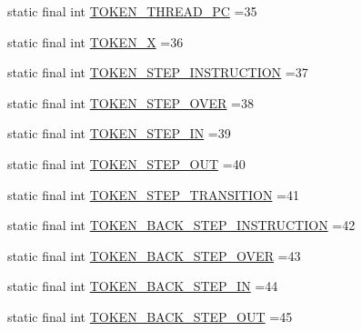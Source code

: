 \begin{DoxyCompactItemize}
static final int \hyperlink{classgov_1_1nasa_1_1jpf_1_1inspector_1_1client_1_1parser_1_1_console_grammar_lexer_aca5fa7b855052a4a32140e034e8127f0}{T\+O\+K\+E\+N\+\_\+\+T\+H\+R\+E\+A\+D\+\_\+\+PC} =35
\item 
static final int \hyperlink{classgov_1_1nasa_1_1jpf_1_1inspector_1_1client_1_1parser_1_1_console_grammar_lexer_a2753c082d68c1e1ea09758c8bd4dae83}{T\+O\+K\+E\+N\+\_\+X} =36
\item 
static final int \hyperlink{classgov_1_1nasa_1_1jpf_1_1inspector_1_1client_1_1parser_1_1_console_grammar_lexer_a88ac4da867647520491ef9351c310cd9}{T\+O\+K\+E\+N\+\_\+\+S\+T\+E\+P\+\_\+\+I\+N\+S\+T\+R\+U\+C\+T\+I\+ON} =37
\item 
static final int \hyperlink{classgov_1_1nasa_1_1jpf_1_1inspector_1_1client_1_1parser_1_1_console_grammar_lexer_a6afb9799c4c1f895e4bafa035f8d94dc}{T\+O\+K\+E\+N\+\_\+\+S\+T\+E\+P\+\_\+\+O\+V\+ER} =38
\item 
static final int \hyperlink{classgov_1_1nasa_1_1jpf_1_1inspector_1_1client_1_1parser_1_1_console_grammar_lexer_ab4a3cd47f502111d3a86710bba7b449f}{T\+O\+K\+E\+N\+\_\+\+S\+T\+E\+P\+\_\+\+IN} =39
\item 
static final int \hyperlink{classgov_1_1nasa_1_1jpf_1_1inspector_1_1client_1_1parser_1_1_console_grammar_lexer_a2f2851c54afd50bece26e5e86179347e}{T\+O\+K\+E\+N\+\_\+\+S\+T\+E\+P\+\_\+\+O\+UT} =40
\item 
static final int \hyperlink{classgov_1_1nasa_1_1jpf_1_1inspector_1_1client_1_1parser_1_1_console_grammar_lexer_a6c24a143cc03bd7e0e622154b574d33b}{T\+O\+K\+E\+N\+\_\+\+S\+T\+E\+P\+\_\+\+T\+R\+A\+N\+S\+I\+T\+I\+ON} =41
\item 
static final int \hyperlink{classgov_1_1nasa_1_1jpf_1_1inspector_1_1client_1_1parser_1_1_console_grammar_lexer_a3198e317a0b7b799b95bdf6a8b0634c6}{T\+O\+K\+E\+N\+\_\+\+B\+A\+C\+K\+\_\+\+S\+T\+E\+P\+\_\+\+I\+N\+S\+T\+R\+U\+C\+T\+I\+ON} =42
\item 
static final int \hyperlink{classgov_1_1nasa_1_1jpf_1_1inspector_1_1client_1_1parser_1_1_console_grammar_lexer_aab6bf0990d3df6d9a05bacdff446b4c5}{T\+O\+K\+E\+N\+\_\+\+B\+A\+C\+K\+\_\+\+S\+T\+E\+P\+\_\+\+O\+V\+ER} =43
\item 
static final int \hyperlink{classgov_1_1nasa_1_1jpf_1_1inspector_1_1client_1_1parser_1_1_console_grammar_lexer_af20329d264f1f6945a4e2e5d36ccc17c}{T\+O\+K\+E\+N\+\_\+\+B\+A\+C\+K\+\_\+\+S\+T\+E\+P\+\_\+\+IN} =44
\item 
static final int \hyperlink{classgov_1_1nasa_1_1jpf_1_1inspector_1_1client_1_1parser_1_1_console_grammar_lexer_a63860c3966db23810cc136782c83eeb0}{T\+O\+K\+E\+N\+\_\+\+B\+A\+C\+K\+\_\+\+S\+T\+E\+P\+\_\+\+O\+UT} =45

\end{DoxyCompactItemize}
